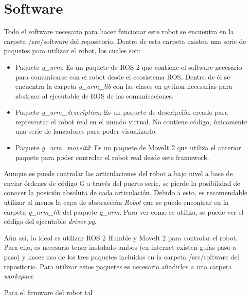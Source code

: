 \section*{Software}
\noindent Todo el software necesario para hacer funcionar este robot se encuentra en la carpeta /src/software del repositorio. Dentro de 
esta carpeta existen una serie de paquetes para utilizar el robot, los cuales son:
\begin{itemize}
\item Paquete \textit{g\_arm}: Es un paquete de ROS 2 que contiene el software necesario para comunicarse con el robot desde el 
ecosistema ROS. Dentro de él se encuentra la carpeta \textit{g\_arm\_lib} con las clases en python necesarias para abstraer al 
ejecutable de ROS de las comunicaciones.
\item Paquete \textit{g\_arm\_description}: Es un paquete de descripción creado para representar el robot real en el mundo virtual. No contiene código, únicamente una serie de lanzadores para poder visualizarlo.
\item Paquete \textit{g\_arm\_moveit2}: Es un paquete de MoveIt 2 que utiliza el anterior paquete para poder controlar el robot 
real desde este framework.
\end{itemize}

Aunque se puede controlar las articulaciones del robot a bajo nivel a base de enviar órdenes de código G a través del puerto serie, se pierde la 
posibilidad de conocer la posición absoluta 
de cada articulación. Debido a esto, es recomendable utilizar al menos la capa de abstracción \textit{Robot} que se puede encontrar en 
la carpeta \textit{g\_arm\_lib} del paquete \textit{g\_arm}. Para ver como se utiliza, se puede ver el código del ejecutable 
\textit{driver.py}. 

Aún así, lo ideal es utilizar ROS 2 Humble y MoveIt 2 para controlar el robot. Para ello, es necesario tener instalado 
ambos (en internet existen guías paso a paso) y hacer uso de los tres paquetes incluidos en la carpeta /src/software del repositorio. 
Para utilizar estos paquetes es necesario añadirlos a una carpeta \textit{workspace} 

Para el firmware del robot tal
